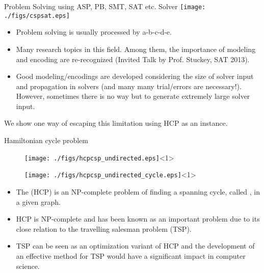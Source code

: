 \documentclass{beamer}
\begin{document}
\begin{frame}{Problem Solving using ASP, PB, SMT, SAT etc. Solver}
  \centering
  \texttt{[image: ./figs/cspsat.eps]}
    \begin{itemize}
    \item Problem solving is usually processed by a-b-c-d-e.
    \item Many research topics in this field. Among them, the
      importance of modeling and encoding are re-recognized (Invited
      Talk by Prof. Stuckey, SAT 2013). 
    \item Good modeling/encodings are developed considering the size of
      solver input and propagation in solvers (and many many
      trial/errors are necessary!). However, sometimes there is no way
      but to generate extremely large solver input. 
    \end{itemize}
 \pause
     \begin{block}{}
       We show one way of escaping this limitation using HCP as an instance.
     \end{block}
\end{frame}

\begin{frame}{Hamiltonian cycle problem}
\begin{center}
\begin{minipage}[c]{0.3\textwidth}
  \begin{figure}
    \centering
    \texttt{[image: ./figs/hcpcsp\_undirected.eps]}<1>
  \end{figure}
\end{minipage}  
\begin{minipage}[c]{0.3\textwidth}
  \begin{figure}
    \centering
    \texttt{[image: ./figs/hcpcsp\_undirected\_cycle.eps]}<1>
  \end{figure}
\end{minipage}  
\end{center}  

\begin{itemize}
\item The  (HCP) is an NP-complete problem of 
finding a spanning cycle, called , in a given graph.
\item HCP is NP-complete and has been known as an important problem due to
its close relation to the travelling salesman problem (TSP). 
\item TSP can be seen as an optimization variant of HCP and the development
of an effective method for TSP would have a significant impact in
computer science. 
\end{itemize}
\end{frame}
\end{document}
